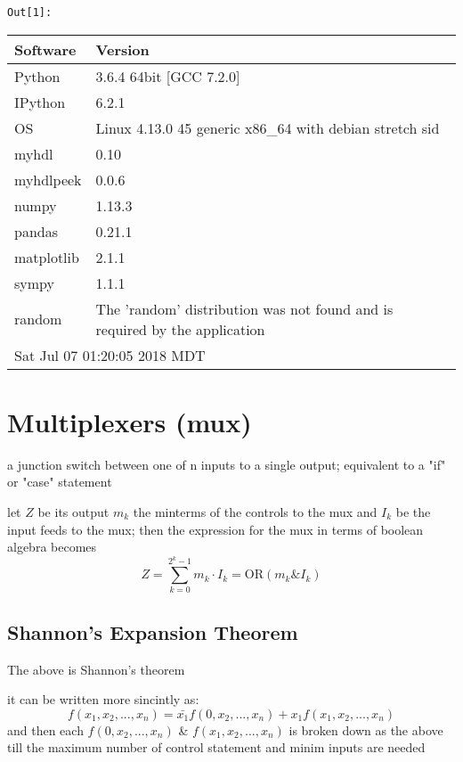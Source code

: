 \documentclass[11pt]{article}
\begin{document}
\texttt{\color{outcolor}Out[{\color{outcolor}1}]:}
    
    \begin{tabular}{|l|l|}\hline
{\bf Software} & {\bf Version} \\ \hline\hline
Python & 3.6.4 64bit [GCC 7.2.0] \\ \hline
IPython & 6.2.1 \\ \hline
OS & Linux 4.13.0 45 generic x86\_64 with debian stretch sid \\ \hline
myhdl & 0.10 \\ \hline
myhdlpeek & 0.0.6 \\ \hline
numpy & 1.13.3 \\ \hline
pandas & 0.21.1 \\ \hline
matplotlib & 2.1.1 \\ \hline
sympy & 1.1.1 \\ \hline
random & The 'random' distribution was not found and is required by the application \\ \hline
\hline \multicolumn{2}{|l|}{Sat Jul 07 01:20:05 2018 MDT} \\ \hline
\end{tabular}


    

    \section{Multiplexers (mux)}\label{multiplexers-mux}

a junction switch between one of n inputs to a single output; equivalent
to a "if" or "case" statement

    let \(Z\) be its output \(m_k\) the minterms of the controls to the mux
and \(I_k\) be the input feeds to the mux; then the expression for the
mux in terms of boolean algebra becomes
\[Z=\sum^{2^k-1}_{k=0} m_k \cdot I_k= \text{OR}(m_k \& I_k) \]

    \subsection{Shannon's Expansion
Theorem}\label{shannons-expansion-theorem}

The above is Shannon's theorem

it can be written more sincintly as:
\[f(x_1, x_2, ..., x_n)=\bar{x_1}f(0, x_2, ..., x_n)+x_1 f(x_1, x_2, ..., x_n)\]
and then each \(f(0, x_2, ..., x_n)\) \& \(f(x_1, x_2, ..., x_n)\) is
broken down as the above till the maximum number of control statement
and minim inputs are needed
\end{document}
